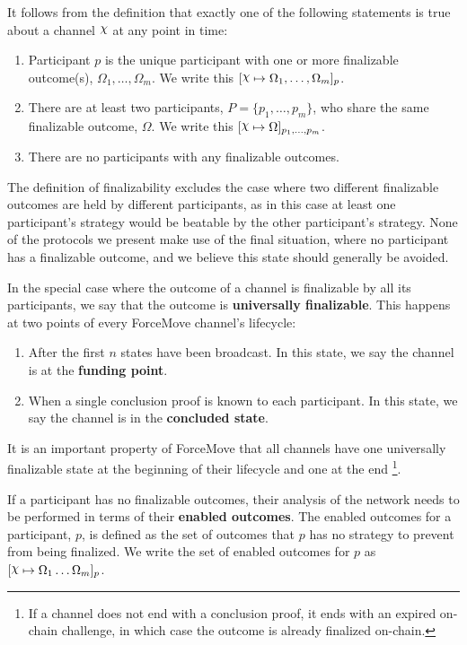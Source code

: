 \documentclass{article}
\begin{document}
It follows from the definition that exactly one of the following statements is true about
a channel $\rchi$ at any point in time:
\begin{enumerate}
  \item Participant $p$ is the unique participant with one or more finalizable outcome(s), $\Omega_1, \dots, \Omega_m$.
        We write this $\finalizable{\rchi}{\Omega_1, \dots, \Omega_m}{p}$.
  \item There are at least two participants, $P = \{p_1, \dots, p_m \}$, who share the same
        finalizable outcome, $\Omega$. We write this $\finalizable{\rchi}{\Omega}{p_1, \dots, p_m}$.
  \item There are no participants with any finalizable outcomes.
\end{enumerate}
The definition of finalizability excludes the case where two different finalizable outcomes are held
by different participants, as in this case at least one participant's strategy would be beatable
by the other participant's strategy.
None of the protocols we present make use of the final situation, where no participant has a finalizable outcome, and we believe this state should generally be avoided.

In the special case where the outcome of a channel is finalizable by all its participants, we say that the outcome is \textbf{universally finalizable}.
This happens at two points of every ForceMove channel's lifecycle:
\begin{enumerate}
  \item After the first $n$ states have been broadcast. In this state, we say the channel is at the \textbf{funding point}.
  \item When a single conclusion proof is known to each participant. In this state, we say the channel is in the \textbf{concluded state}.
\end{enumerate}
It is an important property of ForceMove that all channels have one universally finalizable
state at the beginning of their lifecycle and one at the end
\footnote{If a channel does not end with a conclusion proof, it ends with an expired on-chain challenge,
in which case the outcome is already finalized on-chain.}.

If a participant has no finalizable outcomes, their analysis of the network needs to be performed
in terms of their \textbf{enabled outcomes}.
The enabled outcomes for a participant, $p$, is defined as the set of outcomes that $p$ has
no strategy to prevent from being finalized.
We write the set of enabled outcomes for $p$ as $\finalizable{\rchi}{\Omega_1 \dots \Omega_m}{p}$.
\end{document}

